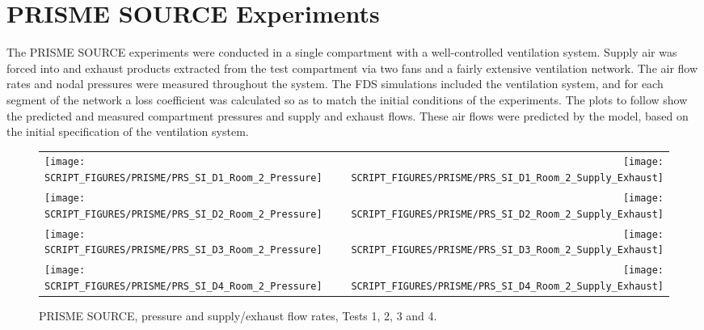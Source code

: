 \clearpage

\section{PRISME SOURCE Experiments}

The PRISME SOURCE experiments were conducted in a single compartment with a well-controlled ventilation system. Supply air was forced into and exhaust products extracted from the test compartment via two fans and a fairly extensive ventilation network. The air flow rates and nodal pressures were measured throughout the system. The FDS simulations included the ventilation system, and for each segment of the network a loss coefficient was calculated so as to match the initial conditions of the experiments. The plots to follow show the predicted and measured compartment pressures and supply and exhaust flows. These air flows were predicted by the model, based on the initial specification of the ventilation system.

\newpage

\begin{figure}[p]
\begin{tabular*}{\textwidth}{l@{\extracolsep{\fill}}r}
\texttt{[image: SCRIPT\_FIGURES/PRISME/PRS\_SI\_D1\_Room\_2\_Pressure]} &
\texttt{[image: SCRIPT\_FIGURES/PRISME/PRS\_SI\_D1\_Room\_2\_Supply\_Exhaust]} \\
\texttt{[image: SCRIPT\_FIGURES/PRISME/PRS\_SI\_D2\_Room\_2\_Pressure]} &
\texttt{[image: SCRIPT\_FIGURES/PRISME/PRS\_SI\_D2\_Room\_2\_Supply\_Exhaust]} \\
\texttt{[image: SCRIPT\_FIGURES/PRISME/PRS\_SI\_D3\_Room\_2\_Pressure]} &
\texttt{[image: SCRIPT\_FIGURES/PRISME/PRS\_SI\_D3\_Room\_2\_Supply\_Exhaust]} \\
\texttt{[image: SCRIPT\_FIGURES/PRISME/PRS\_SI\_D4\_Room\_2\_Pressure]} &
\texttt{[image: SCRIPT\_FIGURES/PRISME/PRS\_SI\_D4\_Room\_2\_Supply\_Exhaust]}
\end{tabular*}
\caption{PRISME SOURCE, pressure and supply/exhaust flow rates, Tests 1, 2, 3 and 4.}
\label{PRISME_SOURCE_Room_2_Pressure_1}
\end{figure}

